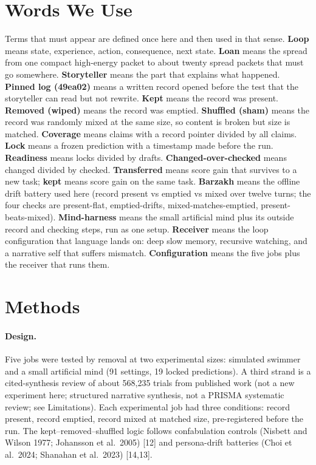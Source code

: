 \documentclass[11pt,a4paper]{article}
\begin{document}
\section{Words We Use}
Terms that must appear are defined once here and then used in that sense. \textbf{Loop} means state, experience, action, consequence, next state. \textbf{Loan} means the spread from one compact high-energy packet to about twenty spread packets that must go somewhere. \textbf{Storyteller} means the part that explains what happened. \textbf{Pinned log (49ea02)} means a written record opened before the test that the storyteller can read but not rewrite. \textbf{Kept} means the record was present. \textbf{Removed (wiped)} means the record was emptied. \textbf{Shuffled (sham)} means the record was randomly mixed at the same size, so content is broken but size is matched. \textbf{Coverage} means claims with a record pointer divided by all claims. \textbf{Lock} means a frozen prediction with a timestamp made before the run. \textbf{Readiness} means locks divided by drafts. \textbf{Changed-over-checked} means changed divided by checked. \textbf{Transferred} means score gain that survives to a new task; \textbf{kept} means score gain on the same task. \textbf{Barzakh} means the offline drift battery used here (record present vs emptied vs mixed over twelve turns; the four checks are present-flat, emptied-drifts, mixed-matches-emptied, present-beats-mixed). \textbf{Mind-harness} means the small artificial mind plus its outside record and checking steps, run as one setup. \textbf{Receiver} means the loop configuration that language lands on: deep slow memory, recursive watching, and a narrative self that suffers mismatch. \textbf{Configuration} means the five jobs plus the receiver that runs them.

\section{Methods}
\paragraph{Design.} Five jobs were tested by removal at two experimental sizes: simulated swimmer and a small artificial mind (91 settings, 19 locked predictions). A third strand is a cited-synthesis review of about 568,235 trials from published work (not a new experiment here; structured narrative synthesis, not a PRISMA systematic review; see Limitations). Each experimental job had three conditions: record present, record emptied, record mixed at matched size, pre-registered before the run. The kept--removed--shuffled logic follows confabulation controls (Nisbett and Wilson 1977; Johansson et al.\ 2005) [12] and persona-drift batteries (Choi et al.\ 2024; Shanahan et al.\ 2023) [14,13].
\end{document}
